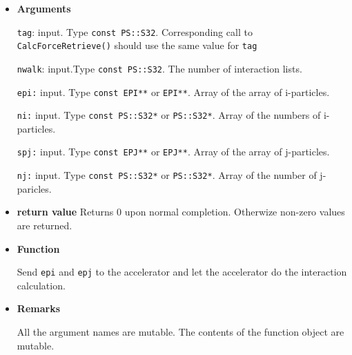 \begin{itemize}


  
  


  


  

  


\item {\bf Arguments}

  {\tt tag}: input. Type {\tt const PS::S32}. Corresponding call to {\tt
    CalcForceRetrieve()} should use the same value for {\tt tag}
  
  {\tt nwalk}: input.Type {\tt const PS::S32}. The number of
  interaction lists. 
  
  {\tt epi:} input. Type {\tt const EPI**} or {\tt EPI**}. Array of
  the array of i-particles.

  {\tt ni:} input. Type {\tt const PS::S32*} or {\tt PS::S32*}. Array
  of the numbers of i-particles.

  {\tt spj:} input. Type {\tt const EPJ**} or {\tt EPJ**}. Array of
  the array of j-particles.
  
  {\tt nj:} input. Type {\tt const PS::S32*} or {\tt PS::S32*}. Array
  of the number of j-paricles.

\item {\bf return value}
   Returns 0 upon normal completion. Otherwize non-zero values are returned.
  
\item {\bf Function}

  Send {\tt epi} and {\tt epj} to the accelerator and let the
  accelerator do the interaction calculation.
  
\item {\bf Remarks}

    All the argument names are mutable. The contents of the function
  object are mutable.

  
\end{itemize}

